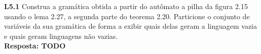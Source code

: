 
\noindent \textbf{L5.1} Construa a gramática obtida a partir do autômato a pilha da figura 2.15 usando o lema 2.27, a segunda parte do teorema 2.20. Particione o conjunto de variáveis da sua gramática de forma a exibir quais delas geram a linguagem vazia e quais geram linguagens não vazias.\\[3pt]
\textbf{Resposta: TODO}